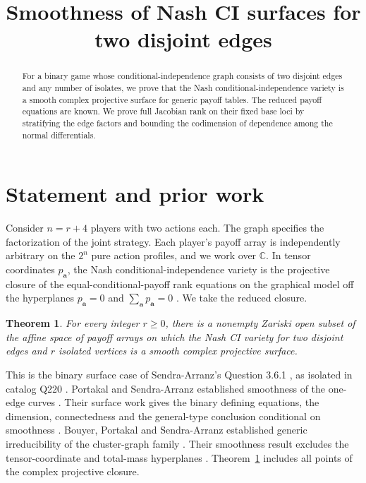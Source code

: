 \documentclass[11pt,a4paper]{amsart}
\title{Smoothness of Nash CI surfaces for two disjoint edges}
\date{}
\newtheorem{theorem}{Theorem}
\newcommand{\CC}{\mathbb C}
\begin{document}
\begin{abstract}
For a binary game whose conditional-independence graph consists of two disjoint
edges and any number of isolates, we prove that the Nash conditional-independence
variety is a smooth complex projective surface for generic payoff tables. The
reduced payoff equations are known. We prove full Jacobian rank on their fixed
base loci by stratifying the edge factors and bounding the codimension of
dependence among the normal differentials.
\end{abstract}
\maketitle

\section{Statement and prior work}

Consider $n=r+4$ players with two actions each. The graph specifies the
factorization of the joint strategy. Each player's payoff array is independently
arbitrary on the $2^n$ pure action profiles, and we work over $\CC$.
In tensor coordinates $p_{\mathbf a}$, the Nash conditional-independence
variety is the projective closure of the equal-conditional-payoff rank equations
on the graphical model off the hyperplanes $p_{\mathbf a}=0$ and
$\sum_{\mathbf a}p_{\mathbf a}=0$ \cite{game,totally}. We take the reduced closure.

\begin{theorem}\label{thm:main}
For every integer $r\geq0$, there is a nonempty Zariski open subset of the
affine space of payoff arrays on which the Nash CI variety for two disjoint
edges and $r$ isolated vertices is a smooth complex projective surface.
\end{theorem}

This is the binary surface case of Sendra-Arranz's Question 3.6.1
\cite[p.~196]{thesis}, as isolated in catalog Q220 \cite{catalog}.
Portakal and Sendra-Arranz established smoothness of the one-edge curves
\cite[Theorem~17]{curve}. Their surface work gives the binary defining
equations, the dimension, connectedness and the general-type conclusion
conditional on smoothness \cite{game}. Bouyer, Portakal and Sendra-Arranz
established generic irreducibility of the cluster-graph family
\cite[Theorem~4.4]{totally}. Their smoothness result excludes the tensor-coordinate
and total-mass hyperplanes \cite[Theorem~3.7]{totally}. Theorem~\ref{thm:main}
includes all points of the complex projective closure.
\end{document}
